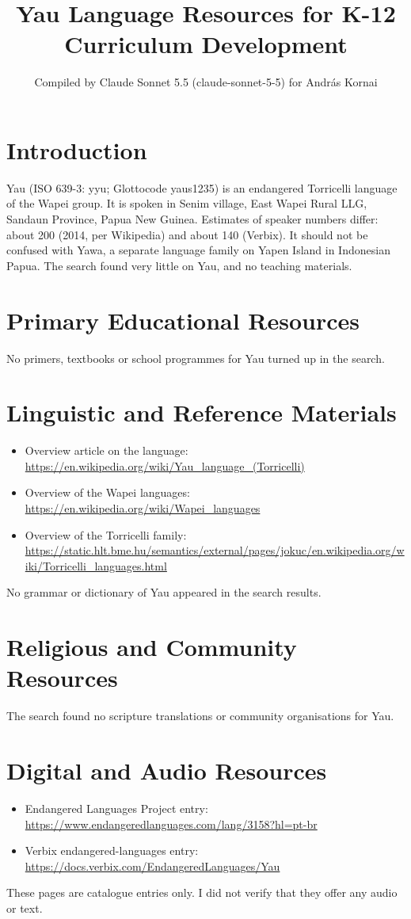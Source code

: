 \documentclass[12pt]{article}
\title{Yau Language Resources for K-12 Curriculum Development}
\author{Compiled by Claude Sonnet 5.5 (claude-sonnet-5-5) for Andr\'as Kornai}
\date{}
\begin{document}
\maketitle

\section{Introduction}
Yau (ISO 639-3: yyu; Glottocode yaus1235) is an endangered Torricelli language of the Wapei group. It is spoken in Senim village, East Wapei Rural LLG, Sandaun Province, Papua New Guinea. Estimates of speaker numbers differ: about 200 (2014, per Wikipedia) and about 140 (Verbix). It should not be confused with Yawa, a separate language family on Yapen Island in Indonesian Papua. The search found very little on Yau, and no teaching materials.

\section{Primary Educational Resources}
No primers, textbooks or school programmes for Yau turned up in the search.

\section{Linguistic and Reference Materials}
\begin{itemize}
\item Overview article on the language: \url{https://en.wikipedia.org/wiki/Yau_language_(Torricelli)}
\item Overview of the Wapei languages: \url{https://en.wikipedia.org/wiki/Wapei_languages}
\item Overview of the Torricelli family: \url{https://static.hlt.bme.hu/semantics/external/pages/jokuc/en.wikipedia.org/wiki/Torricelli_languages.html}
\end{itemize}
No grammar or dictionary of Yau appeared in the search results.

\section{Religious and Community Resources}
The search found no scripture translations or community organisations for Yau.

\section{Digital and Audio Resources}
\begin{itemize}
\item Endangered Languages Project entry: \url{https://www.endangeredlanguages.com/lang/3158?hl=pt-br}
\item Verbix endangered-languages entry: \url{https://docs.verbix.com/EndangeredLanguages/Yau}
\end{itemize}
These pages are catalogue entries only. I did not verify that they offer any audio or text.
\end{document}
